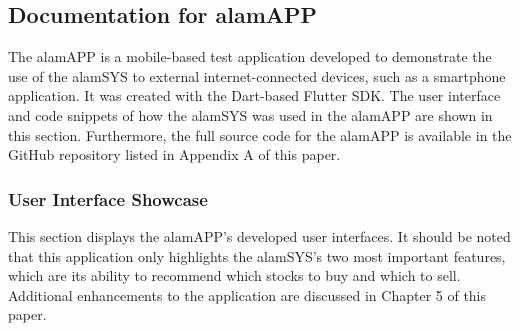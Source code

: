 \subsection{Documentation for alamAPP}
\label{subsec:doc_alamAPP}
The alamAPP is a mobile-based test application developed to 
demonstrate the use of the alamSYS to external internet-connected 
devices, such as a smartphone application. It was created with the 
Dart-based Flutter SDK. The user interface and code snippets of how 
the alamSYS was used in the alamAPP are shown in this section. 
Furthermore, the full source code for the alamAPP is available 
in the GitHub repository listed in Appendix A of this paper.

\subsubsection{User Interface Showcase}
\label{subsubsec:alamAPP_UI}
This section displays the alamAPP's developed user interfaces. 
It should be noted that this application only highlights the 
alamSYS's two most important features, which are its ability 
to recommend which stocks to buy and which to sell. Additional 
enhancements to the application are discussed in Chapter 5 of 
this paper.
\\

